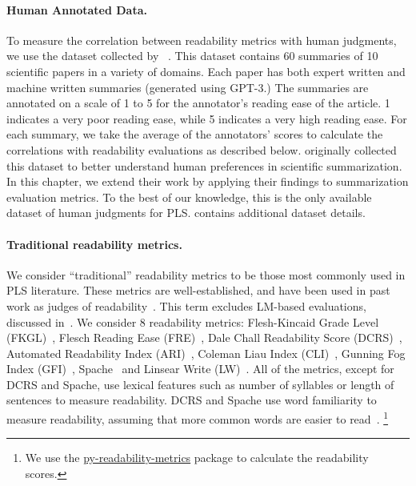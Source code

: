 \paragraph{Human Annotated Data.} 
To measure the correlation between readability metrics with human judgments, we use the dataset collected by ~\textcite{August2024KnowYA}. This dataset contains 60 summaries of 10 scientific papers in a variety of domains. Each paper has both expert written and machine written summaries (generated using GPT-3.) The summaries are annotated on a scale of 1 to 5 for the annotator's reading ease of the article. 1 indicates a very poor reading ease, while 5 indicates a very high reading ease. For each summary, we take the average of the annotators' scores to calculate the correlations with readability evaluations as described below. \textcite{August2024KnowYA} originally collected this dataset to better understand human preferences in scientific summarization. In this chapter, we extend their work by applying their findings to summarization evaluation metrics. To the best of our knowledge, this is the only available dataset of human judgments for PLS.  contains additional dataset details. 


\paragraph{Traditional readability metrics.} We consider ``traditional'' readability metrics to be those most commonly used in PLS literature. These metrics are well-established, and have been used in past work as judges of readability~\cite{chandrasekaran2020overview}. This term excludes LM-based evaluations, discussed in~.
We consider 8 readability metrics: Flesh-Kincaid Grade Level (FKGL)~\cite{flesch1952simplification}, Flesch Reading Ease (FRE)~\cite{Flesch1943MarksOR}, Dale Chall Readability Score (DCRS)~\cite{dale1948formula}, Automated Readability Index (ARI)~\cite{smith1967automated}, Coleman Liau Index (CLI)~\cite{Coleman1975ACR}, Gunning Fog Index (GFI)~\cite{Isnaeni_2017}, Spache~\cite{spache1953new} and Linsear Write (LW)~\cite{o1966gobbledygook}.
All of the metrics, except for DCRS and Spache, use lexical features such as number of syllables or length of sentences to measure readability. DCRS and Spache use word familiarity to measure readability, assuming that more common words are easier to read~\cite{dale1948formula,o1966gobbledygook}.%
\footnote{We use the \href{https://github.com/cdimascio/py-readability-metrics}{py-readability-metrics} package to calculate the readability scores.} %



